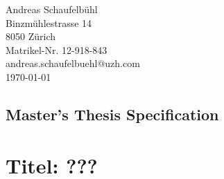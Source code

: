 \documentclass{task_description}
\begin{document}
\thispagestyle{firstpage}
\vspace*{23mm}%
\hfill\parbox[t]{65mm}{

Andreas Schaufelb\"uhl\\
Binzm\"uhlestrasse 14\\
8050 Z\"urich\\[5mm]
Matrikel-Nr. 12-918-843\\
andreas.schaufelbuehl@uzh.com\\[15mm]
\today \\
}
\vspace*{5mm}
\subsection*{Master's Thesis Specification}
%

\section*{Titel: ???}


%
\end{document}
